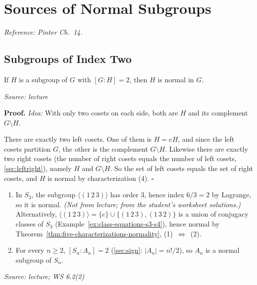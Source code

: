 \documentclass[11pt]{report}
\renewenvironment{proof}[1][Proof]{\noindent\textbf{#1.} }{\hfill$\square$\par\vspace{5pt}}
\newcommand{\srcline}[1]{\par\hfill{\footnotesize\textit{Source: #1}}}
\begin{document}
\section{Sources of Normal Subgroups}\label{sec:normal-sources}

\textit{Reference: Pinter Ch.\ 14.}

\subsection{Subgroups of Index Two}

\begin{propbox}\label{prop:subgroups-index-2-normal}
If $H$ is a subgroup of $G$ with $[G : H] = 2$, then $H$ is normal in $G$.
\srcline{lecture}
\end{propbox}

\begin{proof}
\textit{Idea:} With only two cosets on each side, both are $H$ and its complement $G \setminus H$.\par
There are exactly two left cosets. One of them is $H = eH$, and since the left cosets partition $G$, the other is the complement $G \setminus H$. Likewise there are exactly two right cosets (the number of right cosets equals the number of left cosets, \ref{sec:leftright}), namely $H$ and $G \setminus H$. So the set of left cosets equals the set of right cosets, and $H$ is normal by characterization (4).
\end{proof}

\begin{exbox}\label{ex:index-2-examples}
\begin{enumerate}[nosep]
    \item In $S_3$, the subgroup $\langle (1\,2\,3) \rangle$ has order $3$, hence index $6/3 = 2$ by Lagrange, so it is normal. \textit{(Not from lecture; from the student's worksheet solutions.)} Alternatively, $\langle (1\,2\,3) \rangle = \{e\} \cup \{(1\,2\,3), (1\,3\,2)\}$ is a union of conjugacy classes of $S_3$ (Example~\ref{ex:class-equations-s3-s4}), hence normal by Theorem~\ref{thm:five-characterizations-normality}, (1)~$\Leftrightarrow$~(2).
    \item For every $n \geq 2$, $[S_n : A_n] = 2$ (\ref{sec:sign}: $|A_n| = n!/2$), so $A_n$ is a normal subgroup of $S_n$.
\end{enumerate}
\srcline{lecture; WS 6.2(2)}
\end{exbox}
\end{document}
